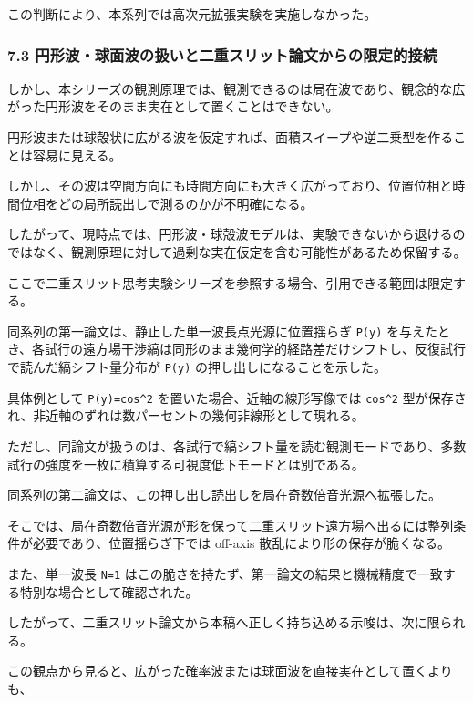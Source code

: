 \documentclass[
]{article}
\begin{document}
この判断により、本系列では高次元拡張実験を実施しなかった。

\subsubsection{7.3
円形波・球面波の扱いと二重スリット論文からの限定的接続}\label{ux5186ux5f62ux6ce2ux7403ux9762ux6ce2ux306eux6271ux3044ux3068ux4e8cux91cdux30b9ux30eaux30c3ux30c8ux8ad6ux6587ux304bux3089ux306eux9650ux5b9aux7684ux63a5ux7d9a}

しかし、本シリーズの観測原理では、観測できるのは局在波であり、観念的な広がった円形波をそのまま実在として置くことはできない。

円形波または球殻状に広がる波を仮定すれば、面積スイープや逆二乗型を作ることは容易に見える。

しかし、その波は空間方向にも時間方向にも大きく広がっており、位置位相と時間位相をどの局所読出しで測るのかが不明確になる。

したがって、現時点では、円形波・球殻波モデルは、実験できないから退けるのではなく、観測原理に対して過剰な実在仮定を含む可能性があるため保留する。

ここで二重スリット思考実験シリーズを参照する場合、引用できる範囲は限定する。

同系列の第一論文は、静止した単一波長点光源に位置揺らぎ \texttt{P(y)}
を与えたとき、各試行の遠方場干渉縞は同形のまま幾何学的経路差だけシフトし、反復試行で読んだ縞シフト量分布が
\texttt{P(y)} の押し出しになることを示した。

具体例として \texttt{P(y)=cos\^{}2} を置いた場合、近軸の線形写像では
\texttt{cos\^{}2}
型が保存され、非近軸のずれは数パーセントの幾何非線形として現れる。

ただし、同論文が扱うのは、各試行で縞シフト量を読む観測モードであり、多数試行の強度を一枚に積算する可視度低下モードとは別である。

同系列の第二論文は、この押し出し読出しを局在奇数倍音光源へ拡張した。

そこでは、局在奇数倍音光源が形を保って二重スリット遠方場へ出るには整列条件が必要であり、位置揺らぎ下では
off-axis 散乱により形の保存が脆くなる。

また、単一波長 \texttt{N=1}
はこの脆さを持たず、第一論文の結果と機械精度で一致する特別な場合として確認された。

したがって、二重スリット論文から本稿へ正しく持ち込める示唆は、次に限られる。

この観点から見ると、広がった確率波または球面波を直接実在として置くよりも、
\end{document}
